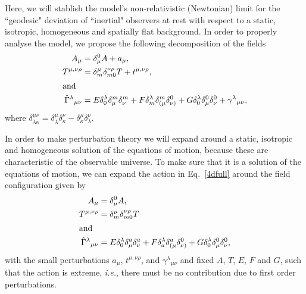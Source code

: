 \documentclass[twocolumn,aps,
  showpacs,showkeys,prd,superscriptaddress]{revtex4-1}
\begin{document}
Here, we will stablish the model's non-relativistic (Newtonian) limit for the ``geodesic" deviation of ``inertial" observers at rest with respect to a static, isotropic, homogeneous and spatially flat background. In order to properly analyse the model, we  propose the following decomposition of the fields
\begin{align}
  A_\mu &= \delta_\mu^0 A + a_\mu,\\
  T^{\mu,\nu\rho} &= \delta^{\mu}_m\delta^{\nu\rho}_{m0}T + t^{\mu,\nu\rho},\\
  \shortintertext{and}
  \hat{\Gamma}^\lambda{}_{\mu\nu} &= E \delta^\lambda_0 \delta^m_\mu \delta^m_\nu + F \delta^\lambda_m \delta^m_{(\mu}\delta^0_{\nu)} + G\delta^\lambda_0 \delta^0_{\mu}\delta^0_{\nu} + \gamma^\lambda{}_{\mu\nu},
\end{align}
where $\delta^{\mu\nu}_{\lambda\kappa}=\delta^{\mu}_{\lambda}\delta^{\nu}_{\kappa}-\delta^{\mu}_{\kappa}\delta^{\nu}_{\lambda}$.%

In order to make perturbation theory we will expand around a static, isotropic and homogeneous solution of the equations of motion, because these are characteristic of the observable universe. To make sure that it is a solution of the equations of motion, we can expand the action in Eq.~\eqref{4dfull} around the field configuration given by
\begin{align}
  A_\mu &= \delta_\mu^0 A,\\
  T^{\mu,\nu\rho} &= \delta^{\mu}_m \delta^{\nu \rho}_{m 0} T\\
  \shortintertext{and}
  \hat{\Gamma}^\lambda{}_{\mu\nu} &= E \delta^\lambda_0 \delta^a_\mu\delta^a_\nu + F\delta^\lambda_a \delta^a_{(\mu}\delta^0_{\nu)} + G\delta^\lambda_0 \delta^0_{\mu}\delta^0_{\nu},
\end{align}
with the small perturbations $a_\mu$, $t^{\mu,\nu\rho}$, and $\gamma^\lambda{}_{\mu\nu}$ and fixed $A$,  $T$, $E$, $F$ and $G$, such that the action is extreme, \emph{i.e.}, there must be no contribution due to first order perturbations.
\end{document}
